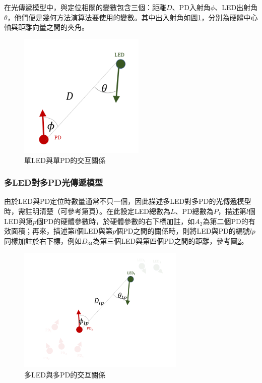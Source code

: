     在光傳遞模型中，與定位相關的變數包含三個：距離$D$、PD入射角$\phi$、LED出射角$\theta$，他們便是幾何方法演算法要使用的變數。其中出入射角如圖\ref{pic:interactive_1to1}，分別為硬體中心軸與距離向量之間的夾角。

    \begin{figure}[h]
        \centering
        \includegraphics[width=6cm]{ch2pic/interactive_1to1.png}
        \caption{單LED與單PD的交互關係}
        \label{pic:interactive_1to1}
    \end{figure}

    \subsubsection{多LED對多PD光傳遞模型}
    \label{chp:model_mul}

    由於LED與PD定位時數量通常不只一個，因此描述多LED對多PD的光傳遞模型時，需註明清楚（可參考第\pageref{chp:symbol}頁）。在此設定LED總數為$L$、PD總數為$P$，描述第$l$個LED與第$p$個PD的硬體參數時，於硬體參數的右下標加註，如$A_2$為第二個PD的有效面積；再來，描述第$l$個LED與第$p$個PD之間的關係時，則將LED與PD的編號$lp$同樣加註於右下標，例如$D_{34}$為第三個LED與第四個PD之間的距離，參考圖\ref{pic:interactive_mul}。
    
    \begin{figure}[h]
        \centering
        \includegraphics[width=8cm]{ch2pic/interactive_mul.png}
        \caption{多LED與多PD的交互關係}
        \label{pic:interactive_mul}
    \end{figure}

